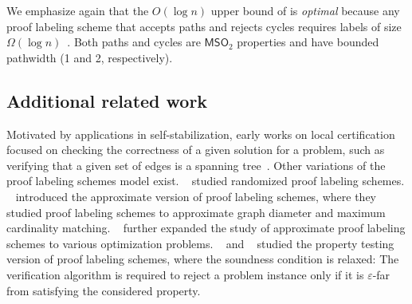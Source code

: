 \documentclass[11pt]{article}
\theoremstyle{definition}
\theoremstyle{remark}
\renewcommand{\epsilon}{\varepsilon}
\newcommand{\MSO}{\mathsf{MSO}_2}
\begin{document}










We emphasize again that the $O(\log n)$ upper bound of  is \emph{optimal} because any proof labeling scheme that accepts paths and rejects cycles requires labels of size $\Omega(\log n)$~\cite{korman03032010}. Both paths and cycles are $\MSO$ properties and have bounded pathwidth (1 and 2, respectively).


\subsection{Additional related work}

Motivated by applications in self-stabilization, early works on local certification focused on checking the correctness of a given solution for a problem, such as verifying that a given set of edges is a spanning tree~\cite{korman03032010}. 
Other variations of the proof labeling schemes model exist. 
\citeauthor{fraginiaud2019random}~\cite{fraginiaud2019random} studied randomized proof labeling schemes.
\citeauthor{CENSORHILLEL2020112}~\cite{CENSORHILLEL2020112} introduced the approximate version of proof labeling schemes, where they studied proof labeling schemes to approximate graph diameter and maximum cardinality matching. \citeauthor{emek_et_al:LIPIcs:2020:13098}~\cite{emek_et_al:LIPIcs:2020:13098} further expanded the study of approximate proof labeling schemes to various optimization problems. 
\citeauthor{elek2022planarity}~\cite{elek2022planarity} and \citeauthor{esperet_et_al:LIPIcs.ICALP.2022.58}~\cite{esperet_et_al:LIPIcs.ICALP.2022.58} studied the property testing version of proof labeling schemes, where the soundness condition is relaxed: The verification algorithm is required to reject a problem instance only if it is $\epsilon$-far from satisfying the considered property.
\end{document}
